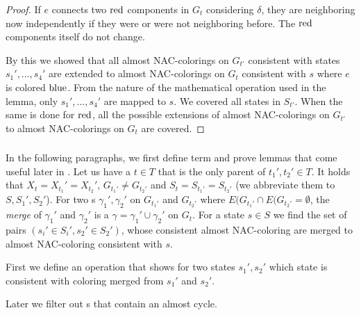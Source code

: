 \begin{proof}
	If \( e \) connects two \( \text{red} \) components in \( G_t \)
	considering \( \delta \),
	they are neighboring now independently if they were or were not neighboring before.
	The \( \text{red} \) components itself do not change.

	By this we showed that all almost NAC-colorings on \( G_{t'} \) consistent with
	states \( s_1', \dots, s_4' \) are extended to almost NAC-colorings on \( G_t \)
	consistent with \( s \) where \( e \) is colored \( \text{blue} \).
	From the nature of the mathematical operation used in the lemma,
	only \( s_1', \dots, s_4' \) are mapped to \( s \).
	We covered all states in \( S_{t'} \).
	When the same is done for \( \text{red} \), all the possible extensions
	of almost NAC-colorings on \( G_{t'} \) to almost NAC-colorings on \( G_t \)
	are covered.
\end{proof}

\subsubsection*{\JoinNode{}}

In the following paragraphs,
we first define term and prove lemmas
that come useful later in .
%
Let us have a \JoinNode{} \( t \in T \) that is
the only parent of \( t_1', t_2' \in T \).
It holds that \( X_t = X_{t_1}' = X_{t_2}' \),
\( G_{t_1'} \ne G_{t_2'} \)
and \( S_t = S_{t_1'} = S_{t_2'} \)
(we abbreviate them to \( S, S_1', S_2' \)).
%
For two \rbcol{}s \( \gamma_1', \gamma_2' \)
on \( G_{t_1'} \) and \( G_{t_2'} \)
where \( E(G_{t_1'} \cap E(G_{t_2'} = \emptyset \),
the \emph{merge} of \( \gamma_1' \) and \( \gamma_2' \)
is a \rbcol{} \( \gamma = \gamma_1' \cup \gamma_2' \) on \( G_t \).
%
For a state \( s \in S \) we find the set of
pairs \( (s_i' \in S_i', s_2' \in S_2') \),
whose consistent almost NAC-coloring are merged
to almost NAC-coloring consistent with \( s \).

First we define an operation that shows for two states \( s_1', s_2' \)
which state is consistent with coloring merged from \( s_1' \) and \( s_2' \).
%
%
Later we filter out \rbcol{}s that contain an almost cycle.

